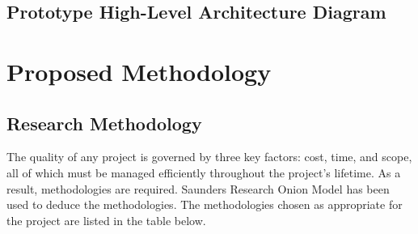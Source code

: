 \documentclass[a4paper, 12pt, oneside]{report}
\begin{document}
\section{Prototype High-Level Architecture Diagram}



\chapter{Proposed Methodology}

\section{Research Methodology}
The quality of any project is governed by three key factors: cost, time, and scope, all of which must be managed efficiently throughout the project's lifetime. As a result, methodologies are required. Saunders  Research Onion Model \autocite{writers_saunders_2019} has been used to deduce the methodologies. 
The methodologies chosen as appropriate for the project are listed in the table below.
\end{document}
